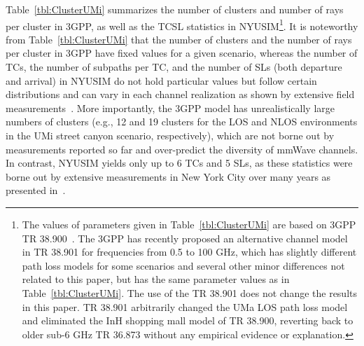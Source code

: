 \documentclass[journal]{IEEEtran}
\begin{document}
Table~\ref{tbl:ClusterUMi} summarizes the number of clusters and number of rays per cluster in 3GPP, as well as the TCSL statistics in NYUSIM\footnote{The values of parameters given in Table~\ref{tbl:ClusterUMi} are based on 3GPP TR 38.900~\cite{3GPP_Dec}. The 3GPP has recently proposed an alternative channel model in TR 38.901 for frequencies from 0.5 to 100 GHz, which has slightly different path loss models for some scenarios and several other minor differences not related to this paper, but has the same parameter values as in Table~\ref{tbl:ClusterUMi}. The use of the TR 38.901 does not change the results in this paper. TR 38.901 arbitrarily changed the UMa LOS path loss model and eliminated the InH shopping mall model of TR 38.900, reverting back to older sub-6 GHz TR 36.873 without any empirical evidence or explanation.}. It is noteworthy from Table~\ref{tbl:ClusterUMi} that the number of clusters and the number of rays per cluster in 3GPP have fixed values for a given scenario, whereas the number of TCs, the number of subpaths per TC, and the number of SLs (both departure and arrival) in NYUSIM do not hold particular values but follow certain distributions and can vary in each channel realization as shown by extensive field measurements~\cite{Rap13:Access,Rap15:TCOM,Samimi15:MTT,Mac15_Indoor}. More importantly, the 3GPP model has unrealistically large numbers of clusters (e.g., 12 and 19 clusters for the LOS and NLOS environments in the UMi street canyon scenario, respectively), which are not borne out by measurements reported so far and over-predict the diversity of mmWave channels. In contrast, NYUSIM yields only up to 6 TCs and 5 SLs, as these statistics were borne out by extensive measurements in New York City over many years as presented in~\cite{Rap13:Access,Rap15:TCOM,Samimi15:MTT,Rap_5GTech}. 
\end{document}

